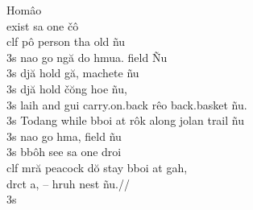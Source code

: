 Hom\^{a}o         \\{exist}
sa         one
\v{c}\^{o}         \\{clf}
p\^{o}         person
tha         old
\~{n}u         \\{3s}
nao         go
ng\u{a}         do
hmua.         field
\~{N}u         \\{3s}
dj\u{a}         hold
g\u{a},         machete
\~{n}u         \\{3s}
dj\u{a}         hold
\v{c}\u{o}ng         hoe
\~{n}u,         \\{3s}
laih         and
gui         carry.on.back
r\^{e}o         back.basket
\~{n}u.         \\{3s}
Todang         while
bboi         at
r\^{o}k         along
jolan         trail
\~{n}u         \\{3s}
nao         go
hma,         field
\~{n}u         \\{3s}
bb\^{o}h         see
sa         one
droi         \\{clf}
mr\u{a}         peacock
d\u{o}         stay
bboi         at
gah,         \\{drct}
a,         --
hruh         nest
\~{n}u.//         \\{3s}





























